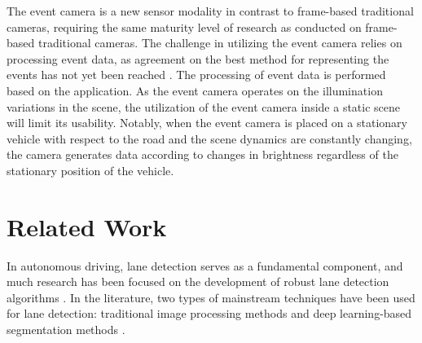 \documentclass[journal]{IEEEtran}
\begin{document}
\par 
The event camera is a new sensor modality in contrast to frame-based traditional cameras, requiring the same maturity level of research as conducted on frame-based traditional cameras. The challenge in utilizing the event camera relies on processing event data, as agreement on the best method for representing the events has not yet been reached \cite{Gallego2019}\cite{r5}. The processing of event data is performed based on the application. As the event camera operates on the illumination variations in the scene, the utilization of the event camera inside a static scene will limit its usability. Notably, when the event camera is placed on a stationary vehicle with respect to the road and the scene dynamics are constantly changing, the camera generates data according to changes in brightness regardless of the stationary position of the vehicle.


\section{Related Work}
In autonomous driving, lane detection serves as a fundamental component, and much research has been focused on the development of robust lane detection algorithms \cite{Hillel2014}. In the literature, two types of mainstream techniques have been used for lane detection: traditional image processing methods and deep learning-based segmentation methods \cite{Aly2008} \cite{Wang2004} \cite{Huval2015}.
\par
\end{document}
